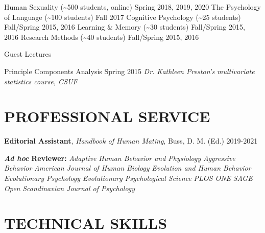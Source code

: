\documentclass[10.5pt,]{article}
\begin{document}
Human Sexuality (\textasciitilde{}500 students, online)
\hfill \textcolor{light-gray}{Spring 2018, 2019, 2020} \newline The
Psychology of Language (\textasciitilde{}100 students)
\hfill \textcolor{light-gray}{Fall 2017} \newline Cognitive Psychology
(\textasciitilde{}25 students)
\hfill \textcolor{light-gray}{Fall/Spring 2015, 2016} \newline Learning
\& Memory (\textasciitilde{}30 students)
\hfill \textcolor{light-gray}{Fall/Spring 2015, 2016} \newline Research
Methods (\textasciitilde{}40 students)
\hfill \textcolor{light-gray}{Fall/Spring 2015, 2016}

\textcolor{light-gray}{Guest Lectures}

Principle Components Analysis \hfill \textcolor{light-gray}{Spring 2015}
\newline
\textit{Dr. Kathleen Preston's multivariate statistics course, CSUF}

\hypertarget{professional-service}{%
\section{PROFESSIONAL SERVICE}\label{professional-service}}

\textbf{Editorial Assistant}, \emph{Handbook of Human Mating}, Buss, D.
M. (Ed.) \hfill \textcolor{light-gray}{2019-2021}

\textbf{\emph{Ad hoc}} \textbf{Reviewer:} \newline \emph{Adaptive Human
Behavior and Physiology} \newline \emph{Aggressive Behavior} \newline
\emph{American Journal of Human Biology} \newline \emph{Evolution and
Human Behavior} \newline \emph{Evolutionary Psychology} \newline
\emph{Evolutionary Psychological Science} \newline \emph{PLOS ONE}
\newline \emph{SAGE Open} \newline \emph{Scandinavian Journal of
Psychology}

\hypertarget{technical-skills}{%
\section{TECHNICAL SKILLS}\label{technical-skills}}
\end{document}
